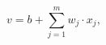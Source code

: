 \begin{equation}
v = b + \sum_{j = 1}^{m}{w_j \cdot x_j},
 \label{eq:inducedlocalfield}
\end{equation}
